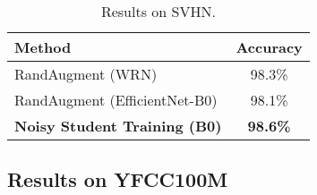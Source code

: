 \documentclass[10pt,twocolumn,letterpaper]{article}
\begin{document}
\begin{table}[h!]
\footnotesize
    \centering
        \begin{tabular}{l|c}
        \toprule 
        Method & Accuracy \\
        \midrule
        RandAugment (WRN) & 98.3\% \\
        \midrule
        RandAugment (EfficientNet-B0) & 98.1\% \\ 
        \bf Noisy Student Training (B0) & \bf 98.6\% \\
        \bottomrule
        \end{tabular}
    \caption{Results on SVHN.}
    \label{tab:results_svhn}
\end{table}


\subsection{Results on YFCC100M}
\label{sec:exp_yfcc100m}
\end{document}

